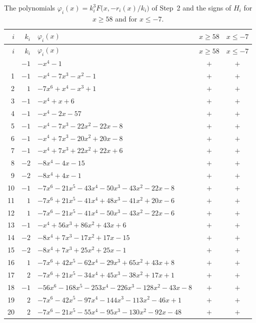 \documentclass[11pt]{article}
\begin{document}
\begingroup\footnotesize
\setlength{\LTcapwidth}{\textwidth}
\begin{longtable}{@{}rrlcc@{}}
\caption{The polynomials $\varphi_i(x)=k_i^3F\bigl(x,-r_i(x)/k_i\bigr)$ of Step~2 and the signs of $H_i$ for $x\geq58$ and for $x\leq-7$.}\label{tab:phi}\\
\hline $i$ & $k_i$ & $\varphi_i(x)$ & $x\geq58$ & $x\leq-7$\\\hline\endfirsthead\hline $i$ & $k_i$ & $\varphi_i(x)$ & $x\geq58$ & $x\leq-7$\\\hline\endhead\hline\endfoot
0 & $-1$ & $-x^{4}-1$ & $+$ & $+$\\
1 & $-1$ & $-x^{4}-7x^{3}-x^{2}-1$ & $+$ & $+$\\
2 & $1$ & $-7x^{6}+x^{4}-x^{3}+1$ & $+$ & $+$\\
3 & $-1$ & $-x^{4}+x+6$ & $+$ & $+$\\
4 & $-1$ & $-x^{4}-2x-57$ & $+$ & $+$\\
5 & $-1$ & $-x^{4}-7x^{3}-22x^{2}-22x-8$ & $+$ & $+$\\
6 & $-1$ & $-x^{4}+7x^{3}-20x^{2}+20x-8$ & $+$ & $+$\\
7 & $-1$ & $-x^{4}+7x^{3}+22x^{2}+22x+6$ & $+$ & $+$\\
8 & $-2$ & $-8x^{4}-4x-15$ & $+$ & $+$\\
9 & $-2$ & $-8x^{4}+4x-1$ & $+$ & $+$\\
10 & $-1$ & $-7x^{6}-21x^{5}-43x^{4}-50x^{3}-43x^{2}-22x-8$ & $+$ & $+$\\
11 & $1$ & $-7x^{6}+21x^{5}-41x^{4}+48x^{3}-41x^{2}+20x-6$ & $+$ & $+$\\
12 & $1$ & $-7x^{6}-21x^{5}-41x^{4}-50x^{3}-43x^{2}-22x-6$ & $+$ & $+$\\
13 & $-1$ & $-x^{4}+56x^{3}+86x^{2}+43x+6$ & $+$ & $+$\\
14 & $-2$ & $-8x^{4}+7x^{3}-17x^{2}+17x-15$ & $+$ & $+$\\
15 & $-2$ & $-8x^{4}+7x^{3}+25x^{2}+25x-1$ & $+$ & $+$\\
16 & $1$ & $-7x^{6}+42x^{5}-62x^{4}-29x^{3}+65x^{2}+43x+8$ & $+$ & $+$\\
17 & $2$ & $-7x^{6}+21x^{5}-34x^{4}+45x^{3}-38x^{2}+17x+1$ & $+$ & $+$\\
18 & $-1$ & $-56x^{6}-168x^{5}-253x^{4}-226x^{3}-128x^{2}-43x-8$ & $+$ & $+$\\
19 & $2$ & $-7x^{6}-42x^{5}-97x^{4}-144x^{3}-113x^{2}-46x+1$ & $+$ & $+$\\
20 & $2$ & $-7x^{6}-21x^{5}-55x^{4}-95x^{3}-130x^{2}-92x-48$ & $+$ & $+$\\
\end{longtable}
\endgroup
\end{document}
